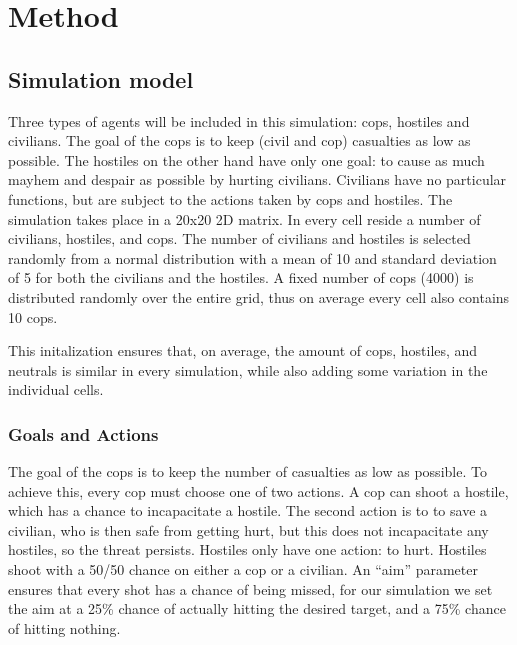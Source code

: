 \section{Method}
\subsection{Simulation model}
Three types of agents will be included in this simulation: cops, hostiles and civilians.
The goal of the cops is to keep (civil and cop) casualties as low as possible.
The hostiles on the other hand have only one goal: to cause as much mayhem and despair as possible by hurting civilians.
Civilians have no particular functions, but are subject to the actions taken by cops and hostiles.
The simulation takes place in a 20x20 2D matrix.
In every cell reside a number of civilians, hostiles, and cops.
The number of civilians and hostiles is selected randomly from a normal distribution 
with a mean of 10 and standard deviation of 5 for both the civilians and the hostiles.
A fixed number of cops (4000) is distributed randomly over the entire grid,
thus on average every cell also contains 10 cops.

This initalization ensures that, on average, the amount of cops, hostiles, and neutrals is 
similar in every simulation, while also adding some variation in the individual cells.

\subsubsection{Goals and Actions}
The goal of the cops is to keep the number of casualties as low as possible.
To achieve this, every cop must choose one of two actions.
A cop can shoot a hostile, which has a chance to incapacitate a hostile.
The second action is to to save a civilian, who is then safe from getting hurt, but this does not incapacitate any hostiles, so the threat persists. 
Hostiles only have one action: to hurt.
Hostiles shoot with a 50/50 chance on either a cop or a civilian. 
An ``aim'' parameter ensures that every shot has a chance of being missed,
for our simulation we set the aim at a 25\% chance of actually hitting the desired target,
and a 75\% chance of hitting nothing.


